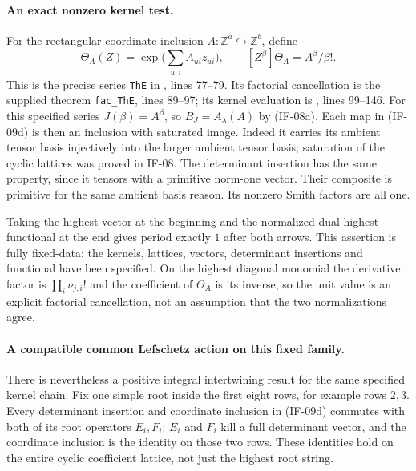 \documentclass[11pt,a4paper]{article}
\theoremstyle{definition}
\theoremstyle{remark}
\begin{document}
\paragraph{An exact nonzero kernel test.}
For the rectangular coordinate inclusion $A:\mathbb Z^a\hookrightarrow
\mathbb Z^b$, define
\[
 \Theta_A(Z)=\exp\bigl(\sum_{u,i}A_{ui}z_{ui}\bigr),\qquad
 [Z^\beta]\Theta_A=A^\beta/\beta!.
\]
This is the precise series \texttt{ThE} in
, lines 77--79.
Its factorial cancellation is the supplied theorem
\texttt{fac\_ThE}, lines 89--97; its kernel evaluation is
, lines 99--146.
For this specified series $J(\beta)=A^\beta$, so
$B_J=A_\lambda(A)$ by (IF-08a). Each map in (IF-09d) is then an
inclusion with saturated image. Indeed it carries its ambient tensor
basis injectively into the larger ambient tensor basis; saturation of
the cyclic lattices was proved in IF-08. The determinant insertion
has the same property, since it tensors with a primitive norm-one
vector. Their composite is primitive for the same ambient basis
reason. Its nonzero Smith factors are all one.

Taking the highest vector at the beginning and the normalized dual
highest functional at the end gives period exactly $1$ after both
arrows. This assertion is fully fixed-data: the kernels, lattices,
vectors, determinant insertions and functional have been specified.
On the highest diagonal monomial the derivative factor is
$\prod_i\nu_{j,i}!$ and the coefficient of $\Theta_A$ is its inverse,
so the unit value is an explicit factorial cancellation, not an
assumption that the two normalizations agree.

\paragraph{A compatible common Lefschetz action on this fixed family.}
There is nevertheless a positive integral intertwining result for the
same specified kernel chain. Fix one simple root inside the first eight
rows, for example rows $2,3$. Every determinant insertion and coordinate
inclusion in (IF-09d) commutes with both of its root operators $E_i,F_i$:
$E_i$ and $F_i$ kill a full determinant vector, and the coordinate
inclusion is the identity on those two rows. These identities hold on
the entire cyclic coefficient lattice, not just the highest root string.
\end{document}
